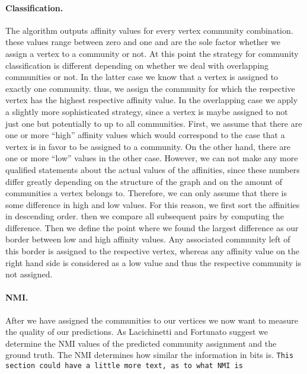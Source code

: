 \paragraph{Classification.}
The algorithm outputs affinity values for every vertex community combination. 
these values range between zero and one and are the sole factor whether we 
assign a vertex to a community or not. At this point the strategy for community classification is different depending on whether we deal with overlapping communities or not. In the latter case we know that a vertex is assigned to exactly one community. thus, we assign the community for which the respective vertex has the highest respective affinity value. In the overlapping case we apply a slightly more sophisticated strategy, since a vertex is maybe assigned to not just one but potentially to up to all communities. First, we assume that there are one or more ``high'' affinity values which would correspond to the 
case that a vertex is in favor to be assigned to a community. On the other hand, there are one or more ``low'' values in the other case. However, we can not make any more qualified statements about the actual values of the affinities, since these numbers differ greatly depending on the structure of the graph and on the amount of communities a vertex belongs to. Therefore, we can only assume that there is some difference in high and low values. For this reason, we first sort the affinities in descending order. then we compare all subsequent pairs by computing the difference. Then we define the point where we found the largest difference as our border between low and high affinity values. Any associated community left of this border is assigned to the respective vertex, whereas any affinity value on the right hand side is considered as a low value and thus the respective community is not assigned.

\paragraph{NMI.}
After we have assigned the communities to our vertices we now want to measure 
the quality of our predictions. As Lacichinetti and Fortunato 
suggest\cite{LF09} we determine the NMI values of the predicted community 
assignment and the ground truth. The NMI determines how similar the 
information in bits is. \texttt{This section could have a little more text, as to what NMI is}
